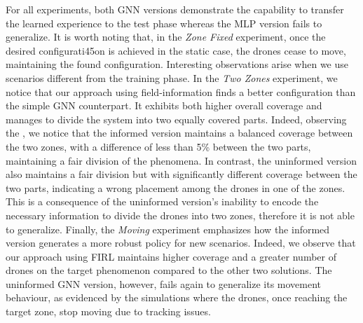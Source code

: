 For all experiments, both \ac{GNN} versions demonstrate the capability to transfer the learned experience to the test phase whereas the MLP version fails to generalize. 
%
It is worth noting that, in the \emph{Zone Fixed} experiment, %
 once the desired configurati45on is achieved in the static case, 
 the drones cease to move, maintaining the found configuration.
%
Interesting observations arise when we use scenarios different from the training phase. 
In the \emph{Two Zones} experiment,
 we notice that our approach using field-information finds a better configuration than the simple GNN counterpart. 
%
It exhibits both higher overall coverage and manages to divide the system into two equally covered parts. 
%
Indeed, observing the , we notice that the informed version maintains a balanced coverage between the two zones, 
 with a difference of less than 5\% between the two parts, maintaining a fair division of the phenomena.
%
In contrast, the uninformed version also maintains a fair division but with significantly different coverage between the two parts, 
 indicating a wrong placement among the drones in one of the zones.
%
This is a consequence of the uninformed version's inability to encode the necessary information to divide the drones into two zones, therefore it is not able to generalize.
%
Finally, the \emph{Moving} experiment emphasizes how the informed version generates a more robust policy for new scenarios. 
 Indeed, we observe that our approach using \ac{FIRL} maintains higher coverage and a greater number of drones on the target phenomenon compared to the other two solutions.
%
The uninformed GNN version, however, 
 fails again to generalize its movement behaviour, as evidenced by the simulations where the drones, once reaching the target zone, stop moving due to tracking issues.

